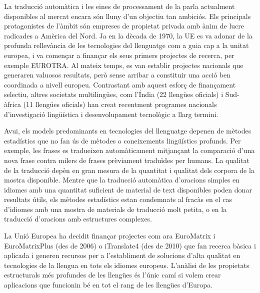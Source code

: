 \begin{multicols}{2}

La traducció automàtica i les eines de processament de la parla actualment disponibles al mercat encara són lluny d'un objectiu tan ambiciós. Els principals protagonistes de l'àmbit són empreses de propietat privada amb ànim de lucre radicades a Amèrica del Nord. Ja en la dècada de 1970, la UE es va adonar de la profunda rellevància de les tecnologies del llenguatge com a guia cap a la unitat europea, i va començar a finançar els seus primers projectes de recerca, per exemple EUROTRA. Al mateix temps, es van establir projectes nacionals que generaren valuosos resultats, però sense arribar a constituir una acció ben coordinada a nivell europeu. Contrastant amb aquest esforç de finançament selectiu, altres societats multilingües, com l'Índia (22 llengües oficials) i Sud-àfrica (11 llengües oficials) han creat recentment programes nacionals d'investigació lingüística i desenvolupament tecnològic a llarg termini.

Avui, els models predominants en tecnologies del llenguatge depenen de mètodes estadístics que no fan ús de mètodes o coneixements lingüístics profunds. Per exemple, les frases es tradueixen automàticament mitjançant la comparació d'una nova frase contra milers de frases prèviament traduïdes per humans. La qualitat de la traducció depèn en gran mesura de la quantitat i qualitat dels corpora de la mostra disponible. Mentre que la traducció automàtica d'oracions simples en idiomes amb una quantitat suficient de material de text disponibles poden donar resultats útils, els mètodes estadístics estan condemnats al fracàs en el cas d'idiomes amb una mostra de materials de traducció molt petita, o en la traducció d'oracions amb estructures complexes.

La Unió Europea ha decidit finançar projectes com ara EuroMatrix i EuroMatrixPlus (des de 2006) o iTranslate4 (des de 2010) que fan recerca bàsica i aplicada i generen recursos per a l'establiment de solucions d'alta qualitat en tecnologies de la llengua en tots els idiomes europeus. L'anàlisi de les propietats estructurals més profundes de les llengües és l'únic camí si volem crear aplicacions que funcionin bé en tot el rang de les llengües d'Europa.


\end{multicols}
